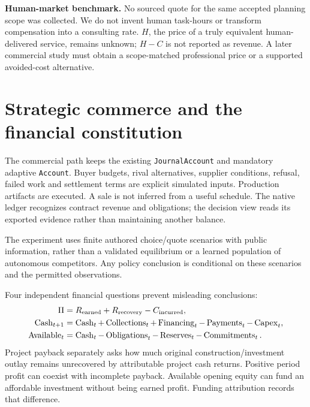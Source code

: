 \documentclass[10pt,a4paper]{article}
\newcommand{\code}[1]{\texttt{\small #1}}
\begin{document}
\textbf{Human-market benchmark.} No sourced quote for the same accepted planning scope was collected. We do not invent human task-hours or transform compensation into a consulting rate. $H$, the price of a truly equivalent human-delivered service, remains unknown; $H-C$ is not reported as revenue. A later commercial study must obtain a scope-matched professional price or a supported avoided-cost alternative.
\newpage

\section{Strategic commerce and the financial constitution}
The commercial path keeps the existing \code{JournalAccount} and mandatory adaptive \code{Account}. Buyer budgets, rival alternatives, supplier conditions, refusal, failed work and settlement terms are explicit simulated inputs. Production artifacts are executed. A sale is not inferred from a useful schedule. The native ledger recognizes contract revenue and obligations; the decision view reads its exported evidence rather than maintaining another balance.

The experiment uses finite authored choice/quote scenarios with public information, rather than a validated equilibrium or a learned population of autonomous competitors. Any policy conclusion is conditional on these scenarios and the permitted observations.

\NativeResults{}

Four independent financial questions prevent misleading conclusions:
\begin{align}
\Pi &= R_{\rm earned}+R_{\rm recovery}-C_{\rm incurred},\\
\operatorname{Cash}_{t+1}&=\operatorname{Cash}_t+\operatorname{Collections}_t+\operatorname{Financing}_t-\operatorname{Payments}_t-\operatorname{Capex}_t,\\
\operatorname{Available}_t&=\operatorname{Cash}_t-\operatorname{Obligations}_t-\operatorname{Reserves}_t-\operatorname{Commitments}_t.
\end{align}
Project payback separately asks how much original construction/investment outlay remains unrecovered by attributable project cash returns. Positive period profit can coexist with incomplete payback. Available opening equity can fund an affordable investment without being earned profit. Funding attribution records that difference.
\end{document}
